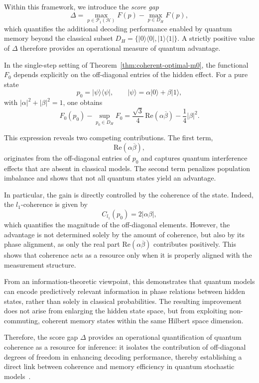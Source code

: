 \documentclass[12pt, reco]{article}
\begin{document}
Within this framework, we introduce the \emph{score gap}
\[
\Delta
=
\max_{p\in\mathcal{P}_1(\mathcal{H})} F(p)
-
\max_{p\in D_H} F(p),
\]
which quantifies the additional decoding performance enabled by quantum memory beyond the classical subset
\(
D_H = \{ |0\rangle\langle0|, |1\rangle\langle1| \}.
\)
A strictly positive value of $\Delta$ therefore provides an operational measure of quantum advantage.

In the single-step setting of Theorem~\ref{thm:coherent-optimal-m0}, the functional $F_0$ depends explicitly on the off-diagonal entries of the hidden effect. For a pure state
\[
p_0 = |\psi\rangle\langle\psi|, 
\qquad 
|\psi\rangle = \alpha|0\rangle + \beta|1\rangle,
\]
with $|\alpha|^2 + |\beta|^2 = 1$, one obtains
\[
F_0(p_0) - \sup_{p_0 \in D_H} F_0
=
\frac{\sqrt{3}}{4}\,\mathrm{Re}(\alpha\overline{\beta})
-
\frac{1}{4}|\beta|^2.
\]

This expression reveals two competing contributions. The first term,
\[
\mathrm{Re}(\alpha\overline{\beta}),
\]
originates from the off-diagonal entries of $p_0$ and captures quantum interference effects that are absent in classical models. The second term penalizes population imbalance and shows that not all quantum states yield an advantage.

In particular, the gain is directly controlled by the coherence of the state. Indeed, the $l_1$-coherence is given by
\[
C_{l_1}(p_0) = 2|\alpha\beta|,
\]
which quantifies the magnitude of the off-diagonal elements. However, the advantage is not determined solely by the amount of coherence, but also by its phase alignment, as only the real part $\mathrm{Re}(\alpha\overline{\beta})$ contributes positively. This shows that coherence acts as a resource only when it is properly aligned with the measurement structure.

From an information-theoretic viewpoint, this demonstrates that quantum models can encode predictively relevant information in phase relations between hidden states, rather than solely in classical probabilities. The resulting improvement does not arise from enlarging the hidden state space, but from exploiting non-commuting, coherent memory states within the same Hilbert space dimension.

Therefore, the score gap $\Delta$ provides an operational quantification of quantum coherence as a resource for inference: it isolates the contribution of off-diagonal degrees of freedom in enhancing decoding performance, thereby establishing a direct link between coherence and memory efficiency in quantum stochastic models~\cite{Elliot21}.
\end{document}
